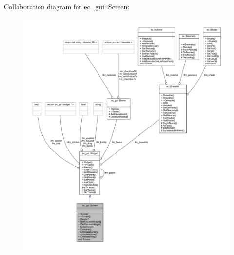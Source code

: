 Collaboration diagram for ec\+\_\+gui\+:\+:Screen\+:
\nopagebreak
\begin{figure}[H]
\begin{center}
\leavevmode
\includegraphics[width=350pt]{classec__gui_1_1_screen__coll__graph}
\end{center}
\end{figure}
